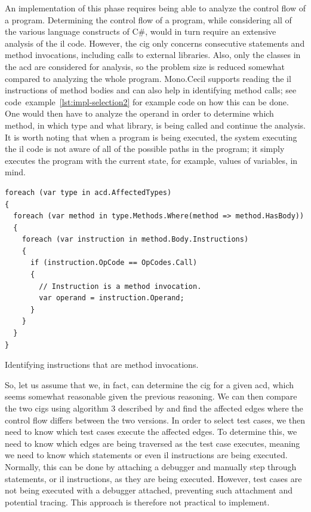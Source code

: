 \documentclass[a4paper,english,12pt]{report}
\begin{document}
An implementation of this phase requires being able to analyze the control flow of a program. Determining the control flow of a program, while considering all of the various language constructs of C\#, would in turn require an extensive analysis of the \gls{il} code. However, the \gls{cig} only concerns consecutive statements and method invocations, including calls to external libraries. Also, only the classes in the \gls{acd} are considered for analysis, so the problem size is reduced somewhat compared to analyzing the whole program. Mono.Cecil supports reading the \gls{il} instructions of method bodies and can also help in identifying method calls; see code~example~\vref{lst:impl-selection2} for example code on how this can be done. One would then have to analyze the operand in order to determine which method, in which type and what library, is being called and continue the analysis. It is worth noting that when a program is being executed, the system executing the \gls{il} code is not aware of all of the possible paths in the program; it simply executes the program with the current state, for example, values of variables, in mind. 

\begin{listing}[htbp]
{\footnotesize
\begin{verbatim}
foreach (var type in acd.AffectedTypes)
{
  foreach (var method in type.Methods.Where(method => method.HasBody))
  {
    foreach (var instruction in method.Body.Instructions)
    {
      if (instruction.OpCode == OpCodes.Call)
      {
        // Instruction is a method invocation.
        var operand = instruction.Operand;
      }
    }
  }
}
\end{verbatim}
}
\caption{Identifying instructions that are method invocations.}
\label{lst:impl-selection2}
\end{listing}

So, let us assume that we, in fact, can determine the \gls{cig} for a given \gls{acd}, which seems somewhat reasonable given the previous reasoning. We can then compare the two \gls{cig}s using algorithm 3 described by \citet[p. 7]{mansour2009regression} and find the affected edges where the control flow differs between the two versions. In order to select test cases, we then need to know which test cases execute the affected edges. To determine this, we need to know which edges are being traversed as the test case executes, meaning we need to know which statements or even \gls{il} instructions are being executed. Normally, this can be done by attaching a debugger and manually step through statements, or \gls{il} instructions, as they are being executed. However, test cases are not being executed with a debugger attached, preventing such attachment and potential tracing. This approach is therefore not practical to implement.
\end{document}
